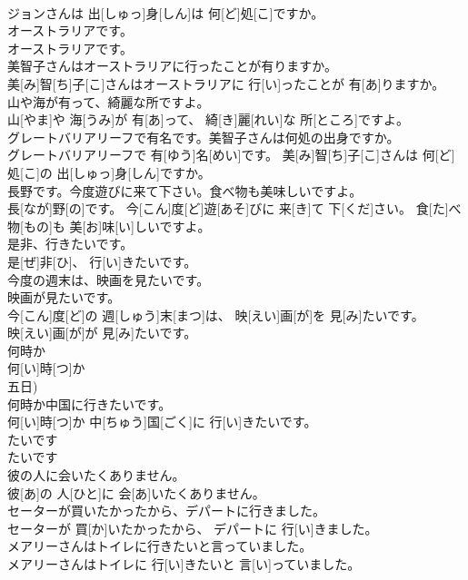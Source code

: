 \documentclass[8pt]{extreport}
\begin{document}
\begin{CJK}{UTF8}{min}
\\	ジョンさんは 出[しゅっ]身[しん]は 何[ど]処[こ]ですか。
\\	オーストラリアです。	
\\	オーストラリアです。
\\	美智子さんはオーストラリアに行ったことが有りますか。	
\\	美[み]智[ち]子[こ]さんはオーストラリアに 行[い]ったことが 有[あ]りますか。
\\	山や海が有って、綺麗な所ですよ。	
\\	山[やま]や 海[うみ]が 有[あ]って、 綺[き]麗[れい]な 所[ところ]ですよ。
\\	グレートバリアリーフで有名です。美智子さんは何処の出身ですか。	
\\	グレートバリアリーフで 有[ゆう]名[めい]です。 美[み]智[ち]子[こ]さんは 何[ど]処[こ]の 出[しゅっ]身[しん]ですか。
\\	長野です。今度遊びに来て下さい。食べ物も美味しいですよ。	
\\	長[なが]野[の]です。 今[こん]度[ど]遊[あそ]びに 来[き]て 下[くだ]さい。 食[た]べ 物[もの]も 美[お]味[い]しいですよ。
\\	是非、行きたいです。	
\\	是[ぜ]非[ひ]、 行[い]きたいです。
\\	今度の週末は、映画を見たいです。 
\\	映画が見たいです。	
\\	今[こん]度[ど]の 週[しゅう]末[まつ]は、 映[えい]画[が]を 見[み]たいです。 
\\	映[えい]画[が]が 見[み]たいです。
\\	何時か	
\\	何[い]時[つ]か 
\\	五日)	
\\	何時か中国に行きたいです。	
\\	何[い]時[つ]か 中[ちゅう]国[ごく]に 行[い]きたいです。
\\	たいです	
\\	たいです
\\	彼の人に会いたくありません。	
\\	彼[あ]の 人[ひと]に 会[あ]いたくありません。
\\	セーターが買いたかったから、デパートに行きました。	
\\	セーターが 買[か]いたかったから、 デパートに 行[い]きました。
\\	メアリーさんはトイレに行きたいと言っていました。	
\\	メアリーさんはトイレに 行[い]きたいと 言[い]っていました。

\end{CJK}
\end{document}
